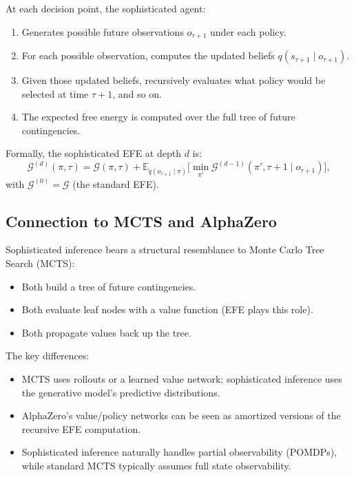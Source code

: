\documentclass[11pt,a4paper]{article}
\theoremstyle{definition}
\newcommand{\E}{\mathbb{E}}
\newcommand{\cG}{\mathcal{G}}
\begin{document}
At each decision point, the sophisticated agent:
\begin{enumerate}[leftmargin=2em]
  \item Generates possible future observations $o_{\tau+1}$ under each policy.
  \item For each possible observation, computes the updated beliefs
    $q(s_{\tau+1} \mid o_{\tau+1})$.
  \item Given those updated beliefs, recursively evaluates what policy would
    be selected at time $\tau+1$, and so on.
  \item The expected free energy is computed over the full tree of future
    contingencies.
\end{enumerate}

Formally, the sophisticated EFE at depth $d$ is:
\begin{equation}
  \cG^{(d)}(\pi, \tau) = \cG(\pi, \tau)
  + \E_{\tilde{q}(o_{\tau+1} \mid \pi)}\bigl[
    \min_{\pi'} \cG^{(d-1)}(\pi', \tau+1 \mid o_{\tau+1})
  \bigr],
  \label{eq:sophisticated}
\end{equation}
with $\cG^{(0)} = \cG$ (the standard EFE).

\subsection{Connection to MCTS and AlphaZero}

Sophisticated inference bears a structural resemblance to Monte Carlo Tree
Search (MCTS):
\begin{itemize}[leftmargin=2em]
  \item Both build a tree of future contingencies.
  \item Both evaluate leaf nodes with a value function (EFE plays this role).
  \item Both propagate values back up the tree.
\end{itemize}

The key differences:
\begin{itemize}[leftmargin=2em]
  \item MCTS uses rollouts or a learned value network; sophisticated inference
    uses the generative model's predictive distributions.
  \item AlphaZero's value/policy networks can be seen as amortized versions
    of the recursive EFE computation.
  \item Sophisticated inference naturally handles partial observability
    (POMDPs), while standard MCTS typically assumes full state observability.
\end{itemize}
\end{document}
